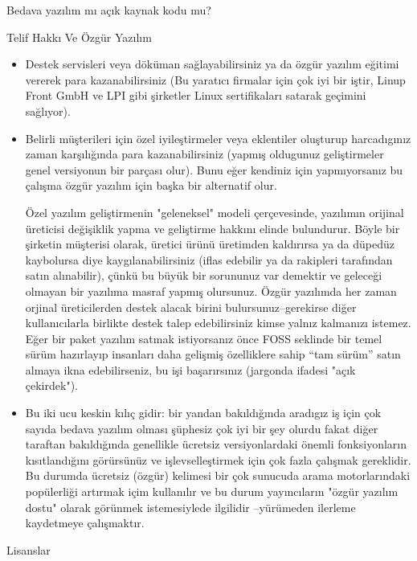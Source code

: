 \begin{section}{Bedava yazılım mı açık kaynak kodu mu?}
\begin{subsection}{Telif Hakkı Ve Özgür Yazılım}
\begin{itemize}
 \item Destek servisleri veya döküman sağlayabilirsiniz ya da özgür yazılım eğitimi vererek para kazanabilirsiniz (Bu yaratıcı firmalar için çok iyi bir iştir, Linup Front GmbH ve LPI gibi şirketler Linux sertifikaları satarak geçimini sağlıyor).
 \item Belirli müşterileri için özel iyileştirmeler veya eklentiler oluşturup harcadıgınız zaman karşılığında para kazanabilirsiniz (yapmış oldugunuz geliştirmeler genel versiyonun bir parçası olur). Bunu eğer kendiniz için yapmıyorsanız bu çalışma özgür yazılım için başka bir alternatif olur.

Özel yazılım geliştirmenin "geleneksel" modeli çerçevesinde, yazılımın orijinal üreticisi değişiklik yapma ve geliştirme hakkını elinde bulundurur. Böyle bir şirketin müşterisi olarak, üretici ürünü üretimden kaldırırsa ya da düpedüz kaybolursa diye kaygılanabilirsiniz (iflas edebilir ya da rakipleri tarafından satın alınabilir), çünkü bu büyük bir sorununuz var demektir ve geleceği olmayan bir yazılıma masraf yapmış olursunuz. Özgür yazılımda her zaman orjinal üreticilerden destek alacak birini bulursunuz--gerekirse diğer kullanıcılarla birlikte destek talep edebilirsiniz kimse yalnız kalmanızı istemez. Eğer bir paket yazılım satmak istiyorsanız önce FOSS seklinde bir temel sürüm hazırlayıp  insanları  daha gelişmiş özelliklere sahip “tam sürüm” satın almaya ikna edebilirseniz, bu işi başarırsınız (jargonda ifadesi "açık çekirdek").

 \item Bu iki ucu keskin kılıç gidir: bir yandan bakıldığında aradıgız iş için çok sayıda bedava yazılım olması şüphesiz çok iyi bir şey olurdu fakat diğer taraftan bakıldığında genellikle ücretsiz versiyonlardaki önemli fonksiyonların kısıtlandığını görürsünüz ve işlevselleştirmek için çok fazla çalışmak gereklidir. Bu durumda ücretsiz (özgür) kelimesi bir çok sunucuda arama motorlarındaki popülerliği artırmak içim kullanılır ve bu durum yayıncıların "özgür yazılım dostu" olarak görünmek istemesiylede ilgilidir --yürümeden ilerleme kaydetmeye çalışmaktır.
 \end{itemize}
\end{subsection}
\begin{subsection}{Lisanslar}


\end{subsection}
\end{section}
